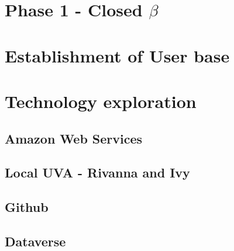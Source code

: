 \section{Phase 1 - Closed $\beta$}
\section{Establishment of User base}
\section{Technology exploration}
\subsection{Amazon Web Services}
\subsection{Local UVA - Rivanna and Ivy}
\subsection{Github}
\subsection{Dataverse}